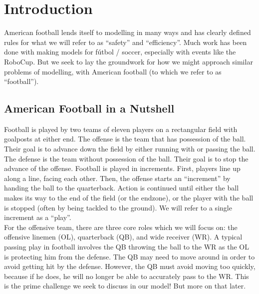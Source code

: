 \setcounter{page}{1} %

\section{Introduction} %

\quad American football lends itself to modelling in many ways and has clearly defined rules for what we will refer to as “safety” and “efficiency”. Much work has been done with making models for fútbol / soccer, especially with events like the RoboCup. But we seek to lay the groundwork for how we might approach similar problems of modelling, with American football (to which we refer to as “football”). 

\subsection{American Football in a Nutshell}

\quad Football is played by two teams of eleven players on a rectangular field with goalposts at either end. The offense is the team that has possession of the ball. Their goal is to advance down the field by either running with or passing the ball. The defense is the team without possession of the ball. Their goal is to stop the advance of the offense. Football is played in increments. First, players line up along a line, facing each other. Then, the offense starts an “increment” by handing the ball to the quarterback. Action is continued until either the ball makes its way to the end of the field (or the endzone), or the player with the ball is stopped (often by being tackled to the ground). We will refer to a single increment as a “play”. \\ 
 
For the offensive team, there are three core roles which we will focus on: the offensive linemen (OL), quarterback (QB), and wide receiver (WR). A typical passing play in football involves the QB throwing the ball to the WR as the OL is protecting him from the defense. The QB may need to move around in order to avoid getting hit by the defense. However, the QB must avoid moving too quickly, because if he does, he will no longer be able to accurately pass to the WR. This is the prime challenge we seek to discuss in our model! But more on that later. \\ 
 
